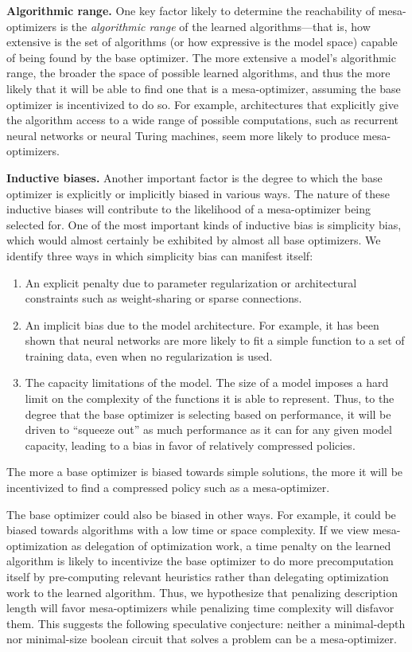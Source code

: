 \documentclass[
  onecolumn,
  natbib,
]{miri-tech-article}
\begin{document}
\textbf{Algorithmic range.} One key factor likely to determine the reachability of mesa-optimizers is the \textit{algorithmic range} of the learned algorithms---that is, how extensive is the set of algorithms (or how expressive is the model space) capable of being found by the base optimizer. The more extensive a model's algorithmic range, the broader the space of possible learned algorithms, and thus the more likely that it will be able to find one that is a mesa-optimizer, assuming the base optimizer is incentivized to do so. For example, architectures that explicitly give the algorithm access to a wide range of possible computations, such as recurrent neural networks or neural Turing machines,\cite{neural_tms} seem more likely to produce mesa-optimizers.

\textbf{Inductive biases.} Another important factor is the degree to which the base optimizer is explicitly or implicitly biased in various ways. The nature of these inductive biases will contribute to the likelihood of a mesa-optimizer being selected for. One of the most important kinds of inductive bias is simplicity bias, which would almost certainly be exhibited by almost all base optimizers. We identify three ways in which simplicity bias can manifest itself:
\begin{enumerate}
\item An explicit penalty due to parameter regularization or architectural constraints such as weight-sharing or sparse connections.
\item An implicit bias due to the model architecture. For example, it has been shown that neural networks are more likely to fit a simple function to a set of training data, even when no regularization is used.\cite{nn_simp_bias}
\item The capacity limitations of the model. The size of a model imposes a hard limit on the complexity of the functions it is able to represent. Thus, to the degree that the base optimizer is selecting based on performance, it will be driven to ``squeeze out'' as much performance as it can for any given model capacity, leading to a bias in favor of relatively compressed policies.
\end{enumerate}
The more a base optimizer is biased towards simple solutions, the more it will be incentivized to find a compressed policy such as a mesa-optimizer.

The base optimizer could also be biased in other ways. For example, it could be biased towards algorithms with a low time or space complexity. If we view mesa-optimization as delegation of optimization work, a time penalty on the learned algorithm is likely to incentivize the base optimizer to do more precomputation itself by pre-computing relevant heuristics rather than delegating optimization work to the learned algorithm. Thus, we hypothesize that penalizing description length will favor mesa-optimizers while penalizing time complexity will disfavor them. This suggests the following speculative conjecture: neither a minimal-depth nor minimal-size boolean circuit that solves a problem can be a mesa-optimizer.\cite{paul_minimal_circuits}
\end{document}
